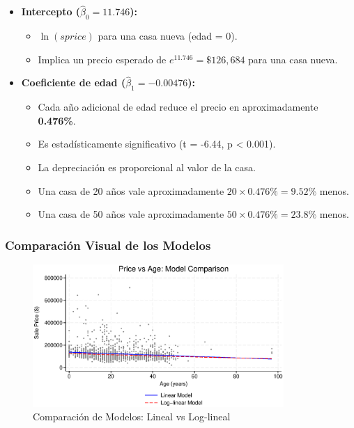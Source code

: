 \documentclass[12pt]{article}
\begin{document}
\begin{itemize}
    \item \textbf{Intercepto ($\hat{\beta}_0 = 11.746$):}
    \begin{itemize}
        \item $\ln(sprice)$ para una casa nueva (edad = 0).
        \item Implica un precio esperado de $e^{11.746} = \$126,684$ para una casa nueva.
    \end{itemize}
    
    \item \textbf{Coeficiente de edad ($\hat{\beta}_1 = -0.00476$):}
    \begin{itemize}
        \item Cada año adicional de edad reduce el precio en aproximadamente \textbf{0.476\%}.
        \item Es estadísticamente significativo (t = -6.44, p < 0.001).
        \item La depreciación es proporcional al valor de la casa.
        \item Una casa de 20 años vale aproximadamente $20 \times 0.476\% = 9.52\%$ menos.
        \item Una casa de 50 años vale aproximadamente $50 \times 0.476\% = 23.8\%$ menos.
    \end{itemize}
\end{itemize}

\subsubsection*{Comparación Visual de los Modelos}

\begin{figure}[htbp]
    \centering
    \includegraphics[width=0.85\textwidth]{Figures/0205-age_models_comparison.eps}
    \caption{Comparación de Modelos: Lineal vs Log-lineal}
    \label{fig:age_models_comparison}
\end{figure}
\end{document}

